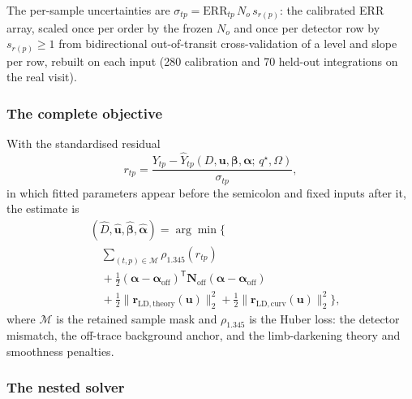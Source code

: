 The per-sample uncertainties are
$\sigma_{tp}=\mathrm{ERR}_{tp}\,N_o\,s_{r(p)}$: the calibrated ERR array,
scaled once per order by the frozen $N_o$ and once per detector row by
$s_{r(p)}\geq 1$ from bidirectional out-of-transit cross-validation of a
level and slope per row, rebuilt on each input (280 calibration and 70
held-out integrations on the real visit).

\subsubsection{The complete objective}


With the standardised residual
\begin{equation}
 r_{tp}=\frac{Y_{tp}-\widehat Y_{tp}
 (D,\bm{u},\bm{\beta},\bm{\alpha};\,q^\star,\Omega)}{\sigma_{tp}},
 \label{eq:residual}
\end{equation}
in which fitted parameters appear before the semicolon and fixed inputs
after it, the estimate is
\begin{equation}
\begin{split}
 &(\widehat D,\widehat{\bm{u}},\widehat{\bm{\beta}},
  \widehat{\bm{\alpha}})
 = \arg\min\Big\{ \\
 &\quad\sum_{(t,p)\in\mathcal{M}}\rho_{1.345}(r_{tp}) \\
 &\quad+\tfrac{1}{2}(\bm{\alpha}-\bm{\alpha}_{\mathrm{off}})^{\mathsf T}
   \bm{N}_{\mathrm{off}}(\bm{\alpha}-\bm{\alpha}_{\mathrm{off}}) \\
 &\quad+\tfrac{1}{2}\|\bm{r}_{\mathrm{LD,theory}}(\bm{u})\|_2^2
  +\tfrac{1}{2}\|\bm{r}_{\mathrm{LD,curv}}(\bm{u})\|_2^2
 \Big\},
\end{split}
 \label{eq:objective}
\end{equation}
where $\mathcal{M}$ is the retained sample mask and $\rho_{1.345}$ is the
Huber loss: the detector mismatch, the off-trace background anchor, and
the limb-darkening theory and smoothness penalties.

\subsubsection{The nested solver}


